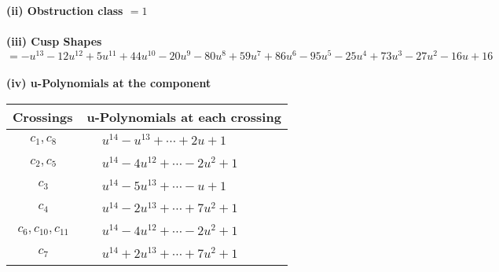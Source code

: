 \documentclass[1p]{elsarticle_modified}
\theoremstyle{definition}
\begin{document}
\flushleft \textbf{(ii) Obstruction class $= 1$}\\~\\
\flushleft \textbf{(iii) Cusp Shapes $= - u^{13}-12 u^{12}+5 u^{11}+44 u^{10}-20 u^9-80 u^8+59 u^7+86 u^6-95 u^5-25 u^4+73 u^3-27 u^2-16 u+16$}\\~\\
\newpage\renewcommand{\arraystretch}{1}
\flushleft \textbf{(iv) u-Polynomials at the component}\newline \\
\begin{tabular}{m{50pt}|m{274pt}}
Crossings & \hspace{64pt}u-Polynomials at each crossing \\
\hline $$\begin{aligned}c_{1},c_{8}\end{aligned}$$&$\begin{aligned}
&u^{14}- u^{13}+\cdots+2 u+1
\end{aligned}$\\
\hline $$\begin{aligned}c_{2},c_{5}\end{aligned}$$&$\begin{aligned}
&u^{14}-4 u^{12}+\cdots-2 u^2+1
\end{aligned}$\\
\hline $$\begin{aligned}c_{3}\end{aligned}$$&$\begin{aligned}
&u^{14}-5 u^{13}+\cdots- u+1
\end{aligned}$\\
\hline $$\begin{aligned}c_{4}\end{aligned}$$&$\begin{aligned}
&u^{14}-2 u^{13}+\cdots+7 u^2+1
\end{aligned}$\\
\hline $$\begin{aligned}c_{6},c_{10},c_{11}\end{aligned}$$&$\begin{aligned}
&u^{14}-4 u^{12}+\cdots-2 u^2+1
\end{aligned}$\\
\hline $$\begin{aligned}c_{7}\end{aligned}$$&$\begin{aligned}
&u^{14}+2 u^{13}+\cdots+7 u^2+1
\end{aligned}$\\

\end{tabular}
\end{document}
